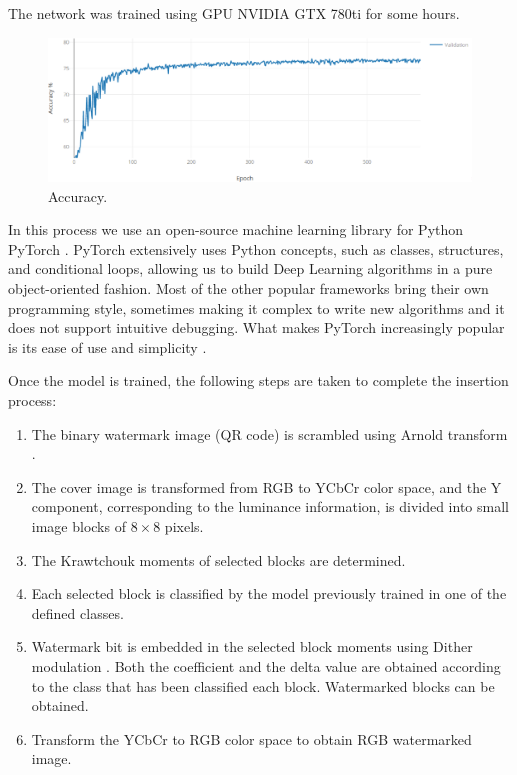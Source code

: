 \documentclass[runningheads]{llncs}
\begin{document}
The network was trained using GPU NVIDIA GTX 780ti for some hours.
\begin{figure}
\begin{center}
	\includegraphics[width=\textwidth]{acc.eps}
	\caption{Accuracy.} \label{acc}
\end{center}
\end{figure}

In this process we use an open-source machine learning library for Python PyTorch \cite{paszke2017pytorch}. PyTorch extensively uses Python concepts, such as classes, structures, and conditional loops, allowing us to build Deep Learning algorithms in a pure object-oriented fashion. Most of the other popular frameworks bring their own programming style, sometimes making it complex to write new algorithms and it does not support intuitive debugging. What makes PyTorch increasingly popular is its ease of use and simplicity \cite{Subramanian2018}.

Once the model is trained, the following steps are taken to complete the insertion process:
\begin{enumerate}
	\item The binary watermark image (QR code) is scrambled using Arnold transform \cite{Arnol'd:1987366}.
	\item The cover image is transformed from RGB to YCbCr color space, and the Y component, corresponding to the luminance information, is divided into small image blocks of $8\times 8$ pixels.
	\item The Krawtchouk moments \cite{Yap2003} of selected blocks are determined.
	\item Each selected block is classified by the model previously trained in one of the defined classes.
	\item Watermark bit is embedded in the selected block moments using Dither modulation \cite{chen2001quantization}. Both the coefficient and the delta value are obtained according to the class that has been classified each block. Watermarked blocks can be obtained. 
	\item Transform the YCbCr to RGB color space to obtain RGB watermarked image.
\end{enumerate}
\end{document}
